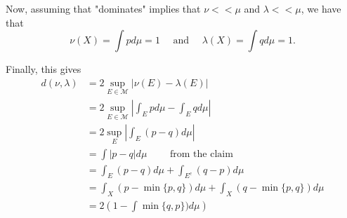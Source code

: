 \documentclass[12pt]{Homework}
\begin{document}
\begin{solution}
\begin{enumerate}[label=(\alph*)]
    Now, assuming that "dominates" implies that $\nu<<\mu$ and $\lambda<<\mu$, we have that $$\nu(X)=\int pd\mu=1\quad\text{ and }\quad\lambda(X)=\int qd\mu=1.$$
    
    Finally, this gives
    \begin{align*}
        d(\nu,\lambda)&=2\sup_{E\in\mathscr{M}}|\nu(E)-\lambda(E)|\\
        &=2\sup_{E\in\mathscr{M}}\left|\int_Epd\mu-\int_Eqd\mu\right|\\
        &=2\sup_E\left|\int_E(p-q)d\mu\right|\\
        &=\int|p-q|d\mu\qquad\text{ from the claim}\\
        &=\int_E(p-q)d\mu+\int_{E^c}(q-p)d\mu\\
        &=\int_X(p-\min\{p,q\})d\mu+\int_X(q-\min\{p,q\})d\mu\\
        &=2\left(1-\int\min\{q,p\})d\mu\right)
    \end{align*}
\end{enumerate}
\end{solution}
\vspace{0.5cm}
\end{document}
